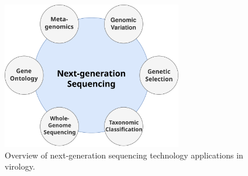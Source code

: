 \begin{figure}[ht!]
	\centering
	\includegraphics[width=0.7\textwidth]{media/2-ngs.pdf}
	\caption{Overview of next-generation sequencing technology applications in virology.}
	\label{fig:2-ngs}
\end{figure} 

